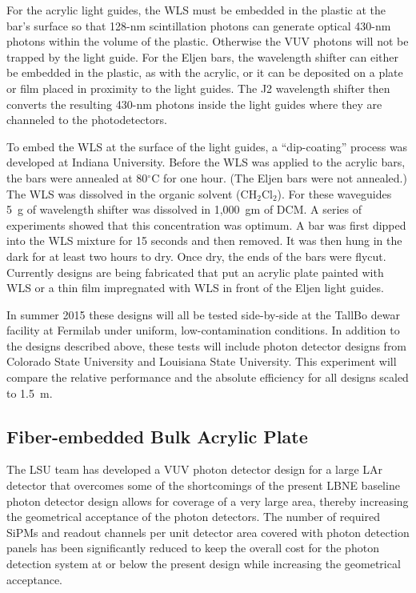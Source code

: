 For the acrylic light guides, the WLS must be embedded in the plastic
at the bar's surface so that 128-nm scintillation photons can generate
optical 430-nm photons within the volume of the plastic.  Otherwise
the VUV photons will not be trapped by the light guide.  For the Eljen
bars, the wavelength shifter can either be embedded in the plastic, as
with the acrylic, or it can be deposited on a plate or film placed in
proximity to the light guides.  The J2 wavelength shifter then
converts the resulting 430-nm photons inside the light guides where
they are channeled to the photodetectors.

To embed the WLS at the surface of the light guides, a ``dip-coating''
process was developed at Indiana University.  Before the WLS was
applied to the acrylic bars, the bars were annealed at 80$^\circ$C for one
hour.  (The Eljen bars were not annealed.)  The WLS was dissolved in the
organic solvent (CH$_2$Cl$_2$).  For these waveguides
5~g of wavelength shifter was dissolved in 1,000~gm of DCM.  A
series of experiments showed that this concentration was optimum.  A
bar was first dipped into the WLS mixture for 15 seconds and then
removed.  It was then hung in the dark for at least two hours to dry.
Once dry, the ends of the bars were flycut.  Currently designs are
being fabricated that put an acrylic plate painted with WLS or a thin
film impregnated with WLS in front of the Eljen light guides.

In summer 2015 these designs will all be tested side-by-side at the
TallBo dewar facility at Fermilab under uniform, low-contamination
conditions.  In addition to the designs described above, these tests
will include photon detector designs from Colorado State University
and Louisiana State University.  This experiment will compare the
relative performance and the absolute efficiency for all designs
scaled to 1.5~m.

\subsection{Fiber-embedded Bulk Acrylic Plate}

The LSU team has developed a VUV photon detector
design for a large LAr detector that overcomes some of the
shortcomings of the present LBNE baseline %
photon detector design allows for coverage of a very large area, thereby
increasing the geometrical acceptance of the photon detectors. The
number of required SiPMs and readout channels per unit detector area
covered with photon detection panels has been significantly reduced to
keep the overall cost for the photon detection system at or below the
present design while increasing the geometrical acceptance. %

